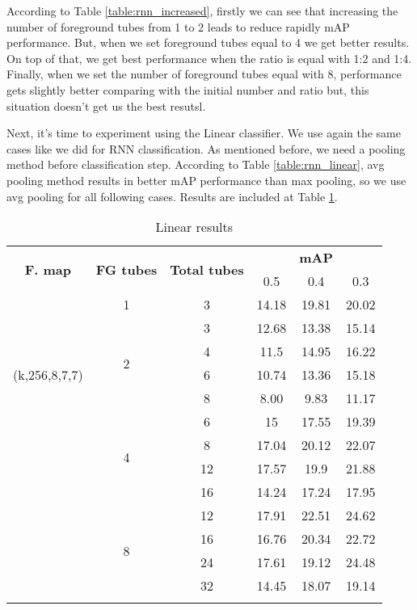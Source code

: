 According to Table \ref{table:rnn_increased}, firstly we can see that increasing the number of foreground tubes from 1 to 2 leads to reduce
rapidly mAP performance. But, when we set foreground tubes equal to 4 we get better results. On top of that, we get best performance when
the ratio is equal with 1:2 and 1:4. Finally, when we set the number of foreground tubes equal with 8, performance gets slightly better
comparing with the initial number and ratio but, this situation doesn't get us the best resutsl. \par 
Next, it's time to experiment using the Linear classifier. We use again the same cases like we did for RNN classification. As mentioned
before, we need a pooling method before classification step. According to Table \ref{table:rnn_linear}, avg pooling method results in
better mAP performance than max pooling, so we use avg pooling for all following cases. Results are included at Table \ref{table:linear_increased}.

\begin{center}
  \begin{longtable}{|| c | c | c || c c c||}
    \hline
    \multirow{2}{*}{\textbf{F. map}} & \multirow{2}{*}{\textbf{FG tubes}} & \multirow{2}{*}{\textbf{Total tubes}} & {} & \textbf{mAP} & {} \\
    {}  & {} & {} & 0.5 & 0.4 & 0.3 \\
    \hline
    \multirow{7}{*}{(k,256,8,7,7)}  & 1 & 3& 14.18 &19.81 & 20.02 \\
    \cline{2-6}
    {} & \multirow{4}{*}{2} & 3 & 12.68 & 13.38 & 15.14 \\
    \cline{3-6}
    {} & {} & 4 & 11.5 & 14.95 & 16.22 \\
    \cline{3-6}
    {} & {} & 6 & 10.74 & 13.36 & 15.18 \\
    \cline{3-6}
    {} & {} & 8 & 8.00 & 9.83 & 11.17 \\
    \cline{2-6}
    {} & \multirow{4}{*}{4} & 6 & 15 & 17.55 & 19.39 \\
    \cline{3-6}
    {} & {} & 8 & 17.04	& 20.12 &22.07 \\
    \cline{3-6}
    {} & {} & 12 & 17.57 & 19.9 & 21.88 \\
    \cline{3-6}
    {} & {} & 16 & 14.24 & 17.24 & 17.95 \\

    \cline{2-6}
    {} & \multirow{4}{*}{8} & 12 & 17.91 & 22.51 & 24.62 \\
    \cline{3-6}
    {} & {} & 16 & 16.76 & 20.34 & 22.72 \\
    \cline{3-6}
    {} & {} & 24 & 17.61 & 19.12 & 24.48 \\
    \cline{3-6}
    {} & {} & 32 & 14.45 & 18.07 & 19.14  \\
    \hline

    \caption{Linear results }
    \label{table:linear_increased}
  \end{longtable}
\end{center}

